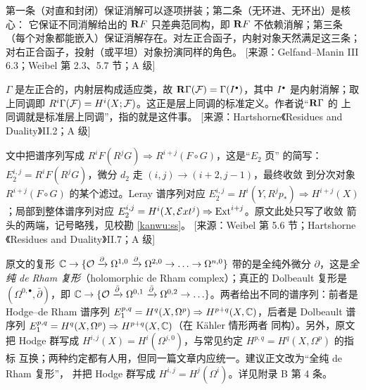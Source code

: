 \begin{yizhu}
第一条（对直和封闭）保证消解可以逐项拼装；第二条（无环进、无环出）是核心：
它保证不同消解给出的 $\mathbf{R} F$ 只差典范同构，即 $\mathbf{R} F$ 不依赖消解；第三条
（每个对象都能嵌入）保证消解存在。对左正合函子，内射对象天然满足这三条；
对右正合函子，投射（或平坦）对象扮演同样的角色。
[来源：Gelfand--Manin III 6.3；Weibel 第 2.3、5.7 节；A 级]
\end{yizhu}

\begin{yizhu}
$\Gamma$ 是左正合的，内射层构成适应类，故
$\mathbf{R}\Gamma(\mathcal{F})=\Gamma(I^{\scriptscriptstyle\bullet})$，其中 $I^{\scriptscriptstyle\bullet}$ 是内射消解；取上同调即
$R^i\Gamma(\mathcal{F})=H^i(X;\mathcal{F})$。这正是层上同调的标准定义。作者说“$\mathbf{R}\Gamma$ 的
上同调就是标准层上同调”，指的就是这件事。
[来源：Hartshorne《Residues and Duality》II.2；A 级]
\end{yizhu}

\begin{yizhu}
文中把谱序列写成 $R^iF(R^jG)\Rightarrow R^{i+j}(F\circ G)$，这是“$E_2$ 页”
的简写：$E_2^{i,j}=R^iF(R^jG)$，微分 $d_2$ 走 $(i,j)\to(i+2,j-1)$，最终收敛
到分次对象 $R^{i+j}(F\circ G)$ 的某个滤过。Leray 谱序列对应
$E_2^{i,j}=H^i(Y,R^jp_*)\Rightarrow H^{i+j}(X)$；局部到整体谱序列对应
$E_2^{i,j}=H^i(X,\mathcal Ext^j)\Rightarrow\operatorname{Ext}^{i+j}$。原文此处只写了收敛
箭头的两端，记号略残，见校勘 \ref{kanwu:ss}。
[来源：Weibel 第 5.6 节；Hartshorne《Residues and Duality》II.7；A 级]
\end{yizhu}

\begin{kanwu}\label{kanwu:dolbeault}
原文的复形
$\mathbb{C}\to\{\mathcal{O}\xrightarrow{\partial}\Omega^{1,0}\xrightarrow{\partial}\Omega^{2,0}
\to\ldots\to\Omega^{n,0}\}$ 带的是全纯外微分 $\partial$，这是\emph{全纯
de Rham 复形}（holomorphic de Rham complex）；真正的 Dolbeault 复形是
$(\Omega^{0,\bullet},\bar\partial)$，即
$\mathbb{C}\to\{\mathcal{O}\xrightarrow{\bar\partial}\Omega^{0,1}\xrightarrow{\bar\partial}
\Omega^{0,2}\to\ldots\}$。两者给出不同的谱序列：前者是 Hodge--de Rham 谱序列
$E_1^{p,q}=H^q(X,\Omega^p)\Rightarrow H^{p+q}(X,\mathbb{C})$，后者是 Dolbeault 谱序列
$E_1^{p,q}=H^q(X,\Omega^p)\Rightarrow H^{p+q}(X,\mathbb{C})$（在 Kähler 情形两者
同构）。另外，原文把 Hodge 群写成
$H^{i,j}(X)=H^i(\Omega^{j,0})$，与常见约定 $H^{p,q}=H^q(X,\Omega^p)$ 的指标
互换；两种约定都有人用，但同一篇文章内应统一。建议正文改为“全纯 de Rham 复形”，
并把 Hodge 群写成 $H^{i,j}=H^j(\Omega^i)$。详见附录 B 第 4 条。
\end{kanwu}

